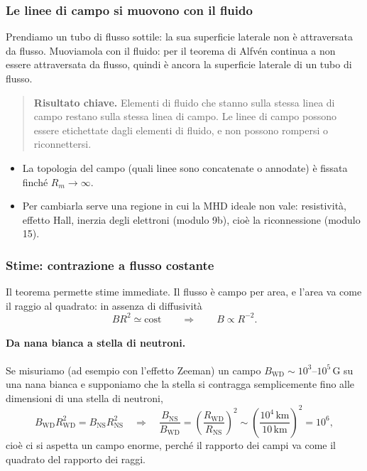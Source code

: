 \subsubsection{Le linee di campo si muovono con il fluido}

Prendiamo un tubo di flusso sottile: la sua superficie laterale non è attraversata da flusso. Muoviamola con il fluido: per il teorema di Alfvén continua a non essere attraversata da flusso, quindi è ancora la superficie laterale di un tubo di flusso.

\begin{quote}
\textbf{Risultato chiave.} Elementi di fluido che stanno sulla stessa linea di campo restano sulla stessa linea di campo. Le linee di campo possono essere etichettate dagli elementi di fluido, e non possono rompersi o riconnettersi.
\end{quote}

\begin{itemize}
\item La topologia del campo (quali linee sono concatenate o annodate) è fissata finché $R_m\to\infty$.
\item Per cambiarla serve una regione in cui la MHD ideale non vale: resistività, effetto Hall, inerzia degli elettroni (modulo 9b), cioè la riconnessione (modulo 15).
\end{itemize}

\subsubsection{Stime: contrazione a flusso costante}

Il teorema permette stime immediate. Il flusso è campo per area, e l'area va come il raggio al quadrato: in assenza di diffusività
\begin{equation}
BR^2\simeq\text{cost}\qquad\Longrightarrow\qquad B\propto R^{-2}.
\end{equation}

\paragraph{Da nana bianca a stella di neutroni.} Se misuriamo (ad esempio con l'effetto Zeeman) un campo $B_{\mathrm{WD}}\sim10^3$--$10^5\,$G su una nana bianca e supponiamo che la stella si contragga semplicemente fino alle dimensioni di una stella di neutroni,
\begin{equation}
B_{\mathrm{WD}}R_{\mathrm{WD}}^2=B_{\mathrm{NS}}R_{\mathrm{NS}}^2\quad\Longrightarrow\quad
\frac{B_{\mathrm{NS}}}{B_{\mathrm{WD}}}=\left(\frac{R_{\mathrm{WD}}}{R_{\mathrm{NS}}}\right)^2\sim\left(\frac{10^4\,\mathrm{km}}{10\,\mathrm{km}}\right)^2=10^6 ,
\end{equation}
cioè ci si aspetta un campo enorme, perché il rapporto dei campi va come il quadrato del rapporto dei raggi.

